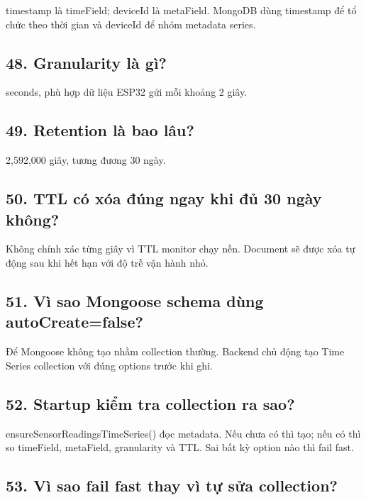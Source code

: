 \documentclass[11pt,oneside,openany]{book}
\renewcommand{\texttt}[1]{{\ttfamily\small #1}}
\begin{document}
\texttt{timestamp} là timeField; \texttt{deviceId} là metaField. MongoDB
dùng timestamp để tổ chức theo thời gian và deviceId để nhóm metadata
series.

\subsection{48. Granularity là gì?}\label{48-granularity-luxe0-guxec}

\texttt{seconds}, phù hợp dữ liệu ESP32 gửi mỗi khoảng 2 giây.

\subsection{49. Retention là bao
lâu?}\label{49-retention-luxe0-bao-luxe2u}

2,592,000 giây, tương đương 30 ngày.

\subsection{50. TTL có xóa đúng ngay khi đủ 30 ngày
không?}\label{50-ttl-cuxf3-xuxf3a-ux111uxfang-ngay-khi-ux111ux1ee7-30-nguxe0y-khuxf4ng}

Không chính xác từng giây vì TTL monitor chạy nền. Document sẽ được xóa
tự động sau khi hết hạn với độ trễ vận hành nhỏ.

\subsection{\texorpdfstring{51. Vì sao Mongoose schema dùng
\texttt{autoCreate=false}?}{51. Vì sao Mongoose schema dùng autoCreate=false?}}\label{51-vuxec-sao-mongoose-schema-duxf9ng-autocreatefalse}

Để Mongoose không tạo nhầm collection thường. Backend chủ động tạo Time
Series collection với đúng options trước khi ghi.

\subsection{52. Startup kiểm tra collection ra
sao?}\label{52-startup-kiux1ec3m-tra-collection-ra-sao}

\texttt{ensureSensorReadingsTimeSeries()} đọc metadata. Nếu chưa có thì
tạo; nếu có thì so timeField, metaField, granularity và TTL. Sai bất kỳ
option nào thì fail fast.

\subsection{53. Vì sao fail fast thay vì tự sửa
collection?}\label{53-vuxec-sao-fail-fast-thay-vuxec-tux1ef1-sux1eeda-collection}
\end{document}
